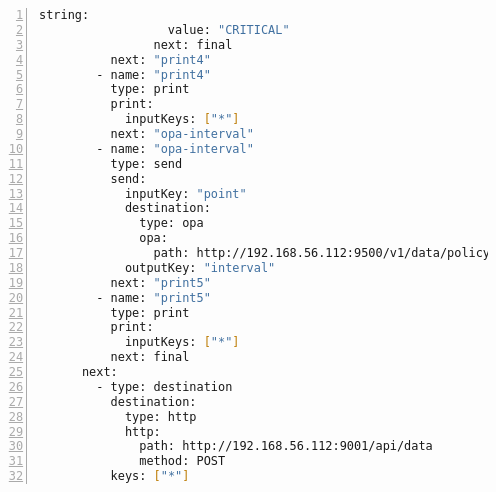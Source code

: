 \begin{lstlisting}[language=sh, caption={\emph{Kod LupN}}, label={lst:a101}, numbers=left, stepnumber=1]
                string: 
                  value: "CRITICAL"
                next: final
          next: "print4"
        - name: "print4"
          type: print
          print:
            inputKeys: ["*"]
          next: "opa-interval"
        - name: "opa-interval"
          type: send
          send: 
            inputKey: "point"
            destination: 
              type: opa
              opa: 
                path: http://192.168.56.112:9500/v1/data/policy/interval
            outputKey: "interval"
          next: "print5"
        - name: "print5"
          type: print
          print:
            inputKeys: ["*"]
          next: final
      next: 
        - type: destination
          destination: 
            type: http
            http: 
              path: http://192.168.56.112:9001/api/data
              method: POST
          keys: ["*"]
\end{lstlisting}